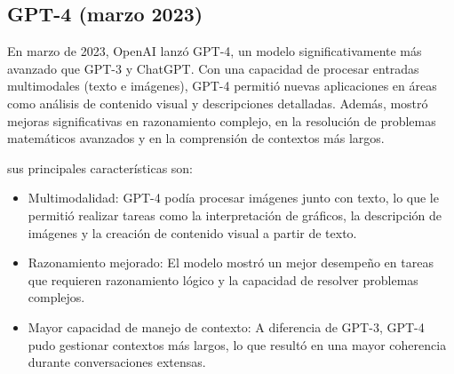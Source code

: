 \subsection{GPT-4 (marzo 2023)}

En marzo de 2023, OpenAI lanzó GPT-4, un modelo significativamente más avanzado que GPT-3 y ChatGPT. 
Con una capacidad de procesar entradas multimodales (texto e imágenes), GPT-4 permitió nuevas aplicaciones en áreas como análisis de contenido visual y descripciones detalladas. 
Además, mostró mejoras significativas en razonamiento complejo, en la resolución de problemas matemáticos avanzados y en la comprensión de contextos más largos.

sus principales características son:

\begin{itemize}
    \item Multimodalidad: GPT-4 podía procesar imágenes junto con texto, lo que le permitió realizar tareas como la interpretación de gráficos, la descripción de imágenes y la creación de contenido visual a partir de texto.
    \item Razonamiento mejorado: El modelo mostró un mejor desempeño en tareas que requieren razonamiento lógico y la capacidad de resolver problemas complejos.
    \item Mayor capacidad de manejo de contexto: A diferencia de GPT-3, GPT-4 pudo gestionar contextos más largos, lo que resultó en una mayor coherencia durante conversaciones extensas.    
\end{itemize}





